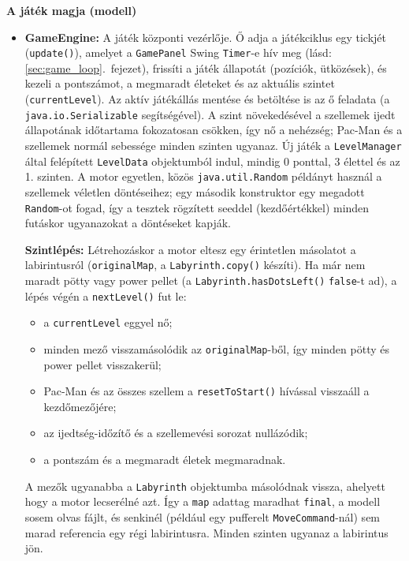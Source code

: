 \documentclass[11pt, a4paper]{article}
\begin{document}
\textbf{A játék magja (modell)}
\begin{itemize}
    \item \textbf{GameEngine:} A játék központi vezérlője. Ő adja a játékciklus egy tickjét (\texttt{update()}), amelyet a \texttt{GamePanel} Swing \texttt{Timer}-e hív meg (lásd: \ref{sec:game_loop}.~fejezet), frissíti a játék állapotát (pozíciók, ütközések), és kezeli a pontszámot, a megmaradt életeket és az aktuális szintet (\texttt{currentLevel}). Az aktív játékállás mentése és betöltése is az ő feladata (a \texttt{java.io.Serializable} segítségével). A szint növekedésével a szellemek ijedt állapotának időtartama fokozatosan csökken, így nő a nehézség; Pac-Man és a szellemek normál sebessége minden szinten ugyanaz. Új játék a \texttt{LevelManager} által felépített \texttt{LevelData} objektumból indul, mindig 0 ponttal, 3 élettel és az 1. szinten. A motor egyetlen, közös \texttt{java.util.Random} példányt használ a szellemek véletlen döntéseihez; egy második konstruktor egy megadott \texttt{Random}-ot fogad, így a tesztek rögzített seeddel (kezdőértékkel) minden futáskor ugyanazokat a döntéseket kapják.

    \textbf{Szintlépés:} Létrehozáskor a motor eltesz egy érintetlen másolatot a labirintusról (\texttt{originalMap}, a \texttt{Labyrinth.copy()} készíti). Ha már nem maradt pötty vagy power pellet (a \texttt{Labyrinth.hasDotsLeft()} \texttt{false}-t ad), a lépés végén a \texttt{nextLevel()} fut le:
    \begin{itemize}
        \item a \texttt{currentLevel} eggyel nő;
        \item minden mező visszamásolódik az \texttt{originalMap}-ből, így minden pötty és power pellet visszakerül;
        \item Pac-Man és az összes szellem a \texttt{resetToStart()} hívással visszaáll a kezdőmezőjére;
        \item az ijedtség-időzítő és a szellemevési sorozat nullázódik;
        \item a pontszám és a megmaradt életek megmaradnak.
    \end{itemize}
    A mezők ugyanabba a \texttt{Labyrinth} objektumba másolódnak vissza, ahelyett hogy a motor lecserélné azt. Így a \texttt{map} adattag maradhat \texttt{final}, a modell sosem olvas fájlt, és senkinél (például egy pufferelt \texttt{MoveCommand}-nál) sem marad referencia egy régi labirintusra. Minden szinten ugyanaz a labirintus jön.


\end{itemize}
\end{document}
